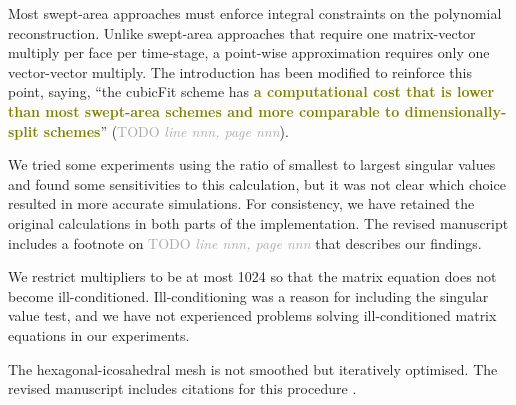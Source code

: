 \documentclass[times]{elsarticle}
\newcommand{\TODO}[1]{\textcolor{darkgray}{TODO \textit{#1}}}
\newcommand{\revthree}[1]{\textcolor{olive}{\textbf{#1}}}
\begin{document}
\begin{quotation}
\begin{comment}
\item Why do you prefer the point wise approximation?
\end{comment}
\end{quotation}
Most swept-area approaches must enforce integral constraints on the polynomial reconstruction.  Unlike swept-area approaches that require one matrix-vector multiply per face per time-stage, a point-wise approximation requires only one vector-vector multiply.
The introduction has been modified to reinforce this point, saying, ``the cubicFit scheme has \revthree{a computational cost that is lower than most swept-area schemes and more comparable to dimensionally-split schemes}'' (\TODO{line nnn, page nnn}).

\begin{quotation}
\begin{comment}
\item The singular value test should be relative to the largest singular value.
\end{comment}
\end{quotation}
We tried some experiments using the ratio of smallest to largest singular values and found some sensitivities to this calculation, but it was not clear which choice resulted in more accurate simulations.
For consistency, we have retained the original calculations in both parts of the implementation.  The revised manuscript includes a footnote on \TODO{line nnn, page nnn} that describes our findings.

\begin{quotation}
\begin{comment}
\item The weighting can degrade the condition number of the least squares problem.
\end{comment}
\end{quotation}
We restrict multipliers to be at most 1024 so that the matrix equation does not become ill-conditioned.  Ill-conditioning was a reason for including the singular value test, and we have not experienced problems solving ill-conditioned matrix equations in our experiments.

\begin{quotation}
\begin{comment}
\item Is there a smoothing of hexagonal-icosahedral mesh after refinement.
\end{comment}
\end{quotation}
The hexagonal-icosahedral mesh is not smoothed but iteratively optimised.  The revised manuscript includes citations for this procedure \citep{heikes-randall1995a,heikes-randall1995b}.
\end{document}
